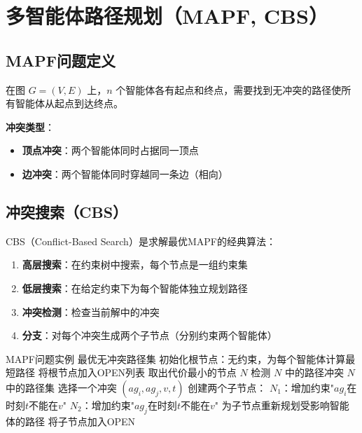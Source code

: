 \section{多智能体路径规划（MAPF, CBS）}

\subsection{MAPF问题定义}

\begin{definition}
在图 $G=(V,E)$ 上，$n$ 个智能体各有起点和终点，需要找到无冲突的路径使所有智能体从起点到达终点。

\textbf{冲突类型}：
\begin{itemize}
  \item \textbf{顶点冲突}：两个智能体同时占据同一顶点
  \item \textbf{边冲突}：两个智能体同时穿越同一条边（相向）
\end{itemize}
\end{definition}

\subsection{冲突搜索（CBS）}

\begin{keypoint}[CBS算法核心思想]
CBS（Conflict-Based Search）是求解最优MAPF的经典算法：
\begin{enumerate}
  \item \textbf{高层搜索}：在约束树中搜索，每个节点是一组约束集
  \item \textbf{低层搜索}：在给定约束下为每个智能体独立规划路径
  \item \textbf{冲突检测}：检查当前解中的冲突
  \item \textbf{分支}：对每个冲突生成两个子节点（分别约束两个智能体）
\end{enumerate}
\end{keypoint}

\begin{algorithm}[htbp]
\caption{CBS算法框架}
\begin{algorithmic}[1]
\Require MAPF问题实例
\Ensure 最优无冲突路径集
\State 初始化根节点：无约束，为每个智能体计算最短路径
\State 将根节点加入OPEN列表
  \State 取出代价最小的节点 $N$
  \State 检测 $N$ 中的路径冲突
    \State \Return $N$ 中的路径集
  \EndIf
  \State 选择一个冲突 $(ag_i, ag_j, v, t)$
  \State 创建两个子节点：
  \State \quad $N_1$：增加约束"$ag_i$在时刻$t$不能在$v$"
  \State \quad $N_2$：增加约束"$ag_j$在时刻$t$不能在$v$"
  \State 为子节点重新规划受影响智能体的路径
  \State 将子节点加入OPEN
\EndWhile
\end{algorithmic}
\end{algorithm}

